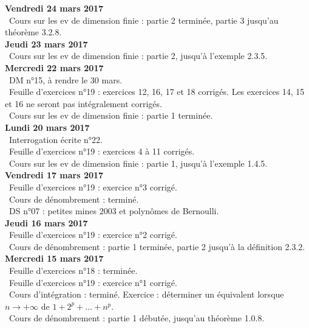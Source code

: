 \documentclass[12pt,a4paper]{article}
\begin{document}
\noindent\textbf{Vendredi 24 mars 2017}\\
\bu\ Cours sur les ev de dimension finie : partie 2 terminée, partie 3 jusqu'au théorème 3.2.8.\vspace{.4cm}\\

\noindent\textbf{Jeudi 23 mars 2017}\\
\bu\ Cours sur les ev de dimension finie : partie 2, jusqu'à l'exemple 2.3.5.\vspace{.4cm}\\

\noindent\textbf{Mercredi 22 mars 2017}\\
\bu\ DM n°15, à rendre le 30 mars.\\
\bu\ Feuille d'exercices n°19 : exercices 12, 16, 17 et 18 corrigés. Les exercices 14, 15 et 16 ne seront pas intégralement corrigés. \\
\bu\ Cours sur les ev de dimension finie : partie 1 terminée.\vspace{.4cm}\\

\noindent\textbf{Lundi 20 mars 2017}\\
\bu\ Interrogation écrite n°22.\\
\bu\ Feuille d'exercices n°19 : exercices 4 à 11 corrigés.\\
\bu\ Cours sur les ev de dimension finie : partie 1, jusqu'à l'exemple 1.4.5.\vspace{.4cm}\\

\noindent\textbf{Vendredi 17  mars 2017}\\
\bu\ Feuille d'exercices n°19 : exercice n°3 corrigé.\\
\bu\ Cours de dénombrement : terminé.\\
\bu\ DS n°07 : petites mines 2003 et polynômes de Bernoulli.\vspace{.4cm}\\

\noindent\textbf{Jeudi 16  mars 2017}\\
\bu\ Feuille d'exercices n°19 : exercice n°2 corrigé.\\
\bu\ Cours de dénombrement : partie 1 terminée, partie 2 jusqu'à la définition 2.3.2.\vspace{.4cm}\\

\noindent\textbf{Mercredi 15  mars 2017}\\
\bu\ Feuille d'exercices n°18 : terminée.\\
\bu\ Feuille d'exercices n°19 : exercice n°1 corrigé.\\
\bu\ Cours d'intégration : terminé. Exercice : déterminer un équivalent lorsque $n \to +\infty$ de $1+2^p+\dots+n^p$.\\
\bu\ Cours de dénombrement : partie 1 débutée, jusqu'au théorème 1.0.8.\vspace{.4cm}\\
\end{document}
